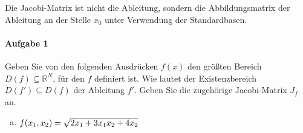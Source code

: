 \documentclass{scrreprt}
\begin{document}
Die Jacobi-Matrix ist nicht die Ableitung, sondern die Abbildungsmatrix
der Ableitung an der Stelle $x_0$ unter Verwendung der Standardbasen.

\paragraph{Aufgabe 1} Geben Sie von den folgenden Ausdrücken $f(x)$ den größten Bereich
$D(f) \subseteq \mathbb{R}^N$, für den $f$ definiert ist.
Wie lautet der Existenzbereich $D(f') \subseteq D(f)$ der Ableitung $f'$.
Geben Sie die zugehörige Jacobi-Matrix $J_f$ an.
\begin{enumerate}[a)]
\item $f\qty(x_1, x_2) = \sqrt{2x_1 + 3x_1x_2 + 4x_2}$
\end{enumerate}
\end{document}
